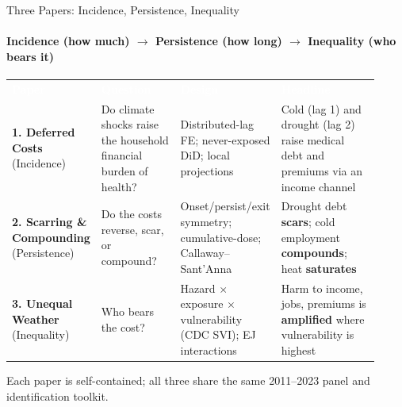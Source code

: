 \documentclass[aspectratio=169,11pt]{beamer}
\newcommand{\emphcolor}[1]{{\color{WarmOrange}\textbf{#1}}}
\newcommand{\graytext}[1]{{\color{WarmGray}#1}}
\begin{document}
\begin{frame}{Three Papers: Incidence, Persistence, Inequality}
  \framesubtitle{Incidence (how much) \(\to\) Persistence (how long) \(\to\) Inequality (who bears it)}
  \footnotesize
  \renewcommand{\arraystretch}{1.25}
  \begin{tabular}{@{}>{\raggedright\arraybackslash}p{0.10\linewidth}>{\raggedright\arraybackslash}p{0.24\linewidth}>{\raggedright\arraybackslash}p{0.27\linewidth}>{\raggedright\arraybackslash}p{0.31\linewidth}@{}}
    \rowcolor{DeepNavy}
    \textcolor{white}{\textbf{Paper}} &
    \textcolor{white}{\textbf{Question}} &
    \textcolor{white}{\textbf{Design}} &
    \textcolor{white}{\textbf{Headline}} \\
    \rowcolor{Teal!10}
    \textbf{1. Deferred Costs} \graytext{(Incidence)}
      & Do climate shocks raise the household financial burden of health?
      & Distributed-lag FE; never-exposed DiD; local projections
      & Cold (lag 1) and drought (lag 2) raise medical debt and premiums via an income channel \\
    \textbf{2. Scarring \& Compounding} \graytext{(Persistence)}
      & Do the costs reverse, scar, or compound?
      & Onset/persist/exit symmetry; cumulative-dose; Callaway--Sant'Anna
      & Drought debt \emphcolor{scars}; cold employment \emphcolor{compounds}; heat \emphcolor{saturates} \\
    \rowcolor{Teal!10}
    \textbf{3. Unequal Weather} \graytext{(Inequality)}
      & Who bears the cost?
      & Hazard \(\times\) exposure \(\times\) vulnerability (CDC SVI); EJ interactions
      & Harm to income, jobs, premiums is \emphcolor{amplified} where vulnerability is highest \\
    \bottomrule
  \end{tabular}
  \vspace{0.3em}
  \begin{center}
    \graytext{\scriptsize Each paper is self-contained; all three share the same 2011--2023 panel and identification toolkit.}
  \end{center}
\end{frame}
\end{document}
